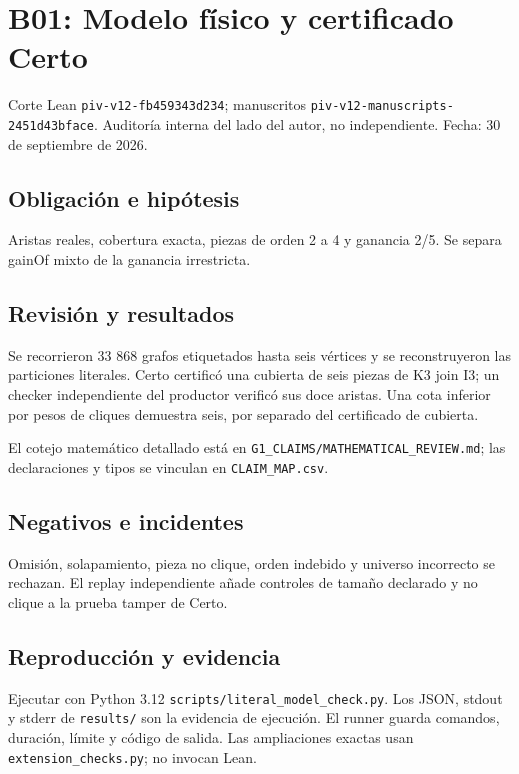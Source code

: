 \section{B01: Modelo físico y certificado
Certo}\label{b01-modelo-fuxedsico-y-certificado-certo}

Corte Lean \texttt{piv-v12-fb459343d234}; manuscritos
\texttt{piv-v12-manuscripts-2451d43bface}. Auditoría interna del lado
del autor, no independiente. Fecha: 30 de septiembre de 2026.

\subsection{Obligación e hipótesis}\label{obligaciuxf3n-e-hipuxf3tesis}

Aristas reales, cobertura exacta, piezas de orden 2 a 4 y ganancia 2/5.
Se separa gainOf mixto de la ganancia irrestricta.

\subsection{Revisión y resultados}\label{revisiuxf3n-y-resultados}

Se recorrieron 33 868 grafos etiquetados hasta seis vértices y se
reconstruyeron las particiones literales. Certo certificó una cubierta
de seis piezas de K3 join I3; un checker independiente del productor
verificó sus doce aristas. Una cota inferior por pesos de cliques
demuestra seis, por separado del certificado de cubierta.

El cotejo matemático detallado está en
\texttt{G1\_CLAIMS/MATHEMATICAL\_REVIEW.md}; las declaraciones y tipos
se vinculan en \texttt{CLAIM\_MAP.csv}.

\subsection{Negativos e incidentes}\label{negativos-e-incidentes}

Omisión, solapamiento, pieza no clique, orden indebido y universo
incorrecto se rechazan. El replay independiente añade controles de
tamaño declarado y no clique a la prueba tamper de Certo.

\subsection{Reproducción y evidencia}\label{reproducciuxf3n-y-evidencia}

Ejecutar con Python 3.12 \texttt{scripts/literal\_model\_check.py}. Los
JSON, stdout y stderr de \texttt{results/} son la evidencia de
ejecución. El runner guarda comandos, duración, límite y código de
salida. Las ampliaciones exactas usan \texttt{extension\_checks.py}; no
invocan Lean.

